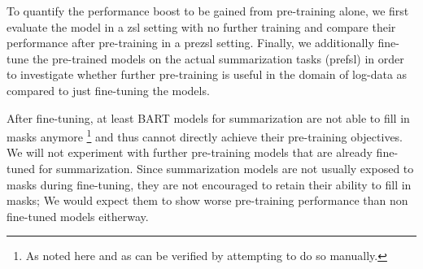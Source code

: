 %
%
To quantify the performance boost to be gained from pre-training alone,
we first evaluate the model in a \ac{zsl} setting with no further training and
compare their performance after pre-training in a \ac{prezsl} setting.
Finally, we additionally fine-tune the pre-trained models on the actual summarization tasks (\acs{prefsl})
in order to investigate whether further pre-training is useful in the domain of log-data as compared to just fine-tuning the models.

After fine-tuning, at least BART models for summarization are not able to fill in masks anymore%
\footnote{As noted here 
and as can be verified by attempting to do so manually.}
and thus cannot directly achieve their pre-training objectives.
We will not experiment with further pre-training models that are already fine-tuned for summarization.
Since summarization models are not usually exposed to masks during fine-tuning,
they are not encouraged to retain their ability to fill in masks;
We would expect them to show worse pre-training performance than non fine-tuned models eitherway.

